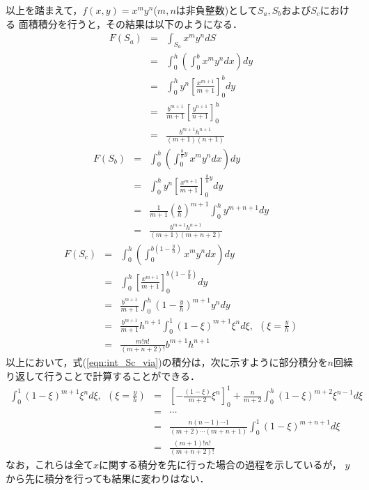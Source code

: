 \documentclass[10pt,a4j]{jarticle}
\begin{document}
以上を踏まえて，$f(x,y)=x^my^n$($m,n$は非負整数)として$S_a, S_b$および$S_c$における
面積積分を行うと，その結果は以下のようになる．
\begin{eqnarray}
	F(S_a) &= & 
	\int_{S_a}x^my^ndS \nonumber \\
	&= & 
	\int_0^h \left( \int_0^b x^m y^n dx \right) dy \nonumber \\
	&= & 
	\int_0^h y^n \left[ \frac{x^{m+1}}{m+1} \right]_0^b dy \nonumber \\
	&= & 
	\frac{b^{m+1}}{m+1}
	\left[
		\frac{y^{n+1}}{n+1}
	\right]_0^h
	\nonumber
	\\
	&= & 
	\frac{ b^{m+1} h^{n+1}}{(m+1)(n+1)}
	\label{eqn:int_Sa_xmyn}
\end{eqnarray}
\begin{eqnarray}
	F(S_b) 
	&= & 
	\int_0^h \left(\int_0^{\frac{b}{h}y} x^my^ndx \right) dy
	\nonumber
	\\
	&= & 
	\int_0^h y^n \left[\frac{x^{m+1}}{m+1}\right]_0^{\frac{b}{h}y}dy 
	\nonumber
	\\
	&= & 
	\frac{1}{m+1}\left(\frac{b}{h}\right)^{m+1} \int_0^h y^{m+n+1}dy 
	\nonumber
	\\
	&= & 
	\frac{b^{m+1}h^{n+1}}{(m+1)(m+n+2)}
	\label{eqn:int_Sb_xmyn}
\end{eqnarray}
\begin{eqnarray}
	F(S_c)&= & 
	\int_0^h \left(\int_0^{b\left( 1-\frac{y}{h}\right) } x^my^ndx \right) dy
	\nonumber
	\\
	&=&
	\int_0^h \left[ \frac{x^{m+1}}{m+1}\right]_0^{b\left(1-\frac{y}{h}\right)} dy \nonumber
	\\
	&=&
	\frac{b^{m+1}}{m+1} \int_0^h \left( 1-\frac{y}{h} \right)^{m+1} y^n dy 
	\nonumber
	\\
	&=&
	\frac{b^{m+1}}{m+1}h^{n+1} \int_0^1 \left( 1-\xi \right)^{m+1} \xi^n d\xi, \ \ \left(\xi=\frac{y}{h}\right) 
	\label{eqn:int_Sc_via}
	\\
	&=&
	\frac{m!n!}{(m+n+2)!}b^{m+1}h^{n+1}
	\label{eqn:int_Sc_xmyn}
\end{eqnarray}
以上において，式(\ref{eqn:int_Sc_via})の積分は，次に示すように部分積分を$n$回繰り返して行うことで計算することができる．
\begin{eqnarray}
	\int_0^1 \left( 1-\xi \right)^{m+1} \xi^n d\xi, \ \ (\xi=\frac{y}{h}) 
	&=&
	\left[-\frac{(1-\xi)}{m+2}\xi^n\right]_0^1 + \frac{n}{m+2}\int_0^h (1-\xi)^{m+2}\xi^{n-1}d\xi
	\nonumber
	\\
	&=&
	\cdots
	\nonumber
	\\
	&=&
	\frac{n(n-1)\cdots 1}{(m+2)\cdots (m+n+1)} \int_0^1 (1-\xi)^{m+n+1}d\xi 
	\nonumber
	\\
	&=&
	\frac{(m+1)! n!}{(m+n+2)!}
	\label{eqn:int_by_part}
\end{eqnarray}
なお，これらは全て$x$に関する積分を先に行った場合の過程を示しているが，
$y$から先に積分を行っても結果に変わりはない．
\end{document}
